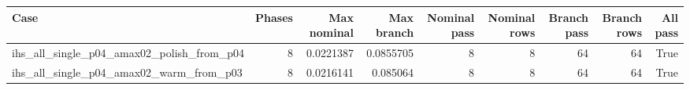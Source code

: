 \begin{tabular}{lrrrrrrrr}
\toprule
Case & Phases & Max nominal & Max branch & Nominal pass & Nominal rows & Branch pass & Branch rows & All pass \\
\midrule
ihs\_all\_single\_p04\_amax02\_polish\_from\_p04 & 8 & 0.0221387 & 0.0855705 & 8 & 8 & 64 & 64 & True \\
ihs\_all\_single\_p04\_amax02\_warm\_from\_p03 & 8 & 0.0216141 & 0.085064 & 8 & 8 & 64 & 64 & True \\
\bottomrule
\end{tabular}
